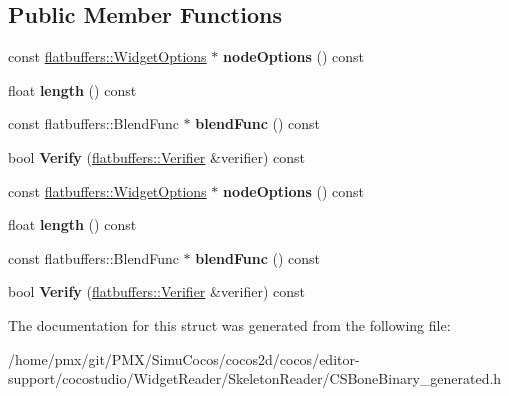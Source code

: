 \subsection*{Public Member Functions}
\begin{DoxyCompactItemize}
\item 
\mbox{\label{structflatbuffers_1_1BoneOptions_a68cf1ccc9d9d8609412a28926338c964}} 
const \hyperlink{structflatbuffers_1_1WidgetOptions}{flatbuffers\+::\+Widget\+Options} $\ast$ {\bfseries node\+Options} () const
\item 
\mbox{\label{structflatbuffers_1_1BoneOptions_a1fcde260039a68453e5e163422f9ecc9}} 
float {\bfseries length} () const
\item 
\mbox{\label{structflatbuffers_1_1BoneOptions_aff98e0bc3e97560eecb19c6d2ec9f9fc}} 
const flatbuffers\+::\+Blend\+Func $\ast$ {\bfseries blend\+Func} () const
\item 
\mbox{\label{structflatbuffers_1_1BoneOptions_abea61150e737e83bf3615ad022bd98c6}} 
bool {\bfseries Verify} (\hyperlink{classflatbuffers_1_1Verifier}{flatbuffers\+::\+Verifier} \&verifier) const
\item 
\mbox{\label{structflatbuffers_1_1BoneOptions_a68cf1ccc9d9d8609412a28926338c964}} 
const \hyperlink{structflatbuffers_1_1WidgetOptions}{flatbuffers\+::\+Widget\+Options} $\ast$ {\bfseries node\+Options} () const
\item 
\mbox{\label{structflatbuffers_1_1BoneOptions_a1fcde260039a68453e5e163422f9ecc9}} 
float {\bfseries length} () const
\item 
\mbox{\label{structflatbuffers_1_1BoneOptions_aff98e0bc3e97560eecb19c6d2ec9f9fc}} 
const flatbuffers\+::\+Blend\+Func $\ast$ {\bfseries blend\+Func} () const
\item 
\mbox{\label{structflatbuffers_1_1BoneOptions_abea61150e737e83bf3615ad022bd98c6}} 
bool {\bfseries Verify} (\hyperlink{classflatbuffers_1_1Verifier}{flatbuffers\+::\+Verifier} \&verifier) const
\end{DoxyCompactItemize}


The documentation for this struct was generated from the following file\+:\begin{DoxyCompactItemize}
\item 
/home/pmx/git/\+P\+M\+X/\+Simu\+Cocos/cocos2d/cocos/editor-\/support/cocostudio/\+Widget\+Reader/\+Skeleton\+Reader/C\+S\+Bone\+Binary\+\_\+generated.\+h\end{DoxyCompactItemize}
